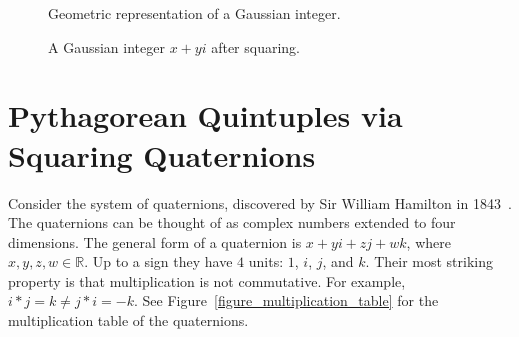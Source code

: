 \documentclass[12pt,table]{article}
\theoremstyle{definition}
\theoremstyle{remark}
\newcommand{\Rrr}{\mathbb R}
\numberwithin{equation}{section}
\begin{document}
\begin{figure}
\begin{center}
\end{center}
\caption{Geometric representation of a Gaussian integer.}
\label{figure_Pythagorean}
\end{figure}





\begin{figure}
\begin{center}
\end{center}
\caption{A Gaussian integer $x+yi$ after squaring.}
\label{figure_Pythagorean_squared}
\end{figure}

\section{Pythagorean Quintuples via Squaring Quaternions}


Consider the system of quaternions, discovered by Sir William Hamilton 
in 1843~\cite{Hamilton}.
The quaternions can be thought
of as complex numbers extended to four dimensions.
The general
 form of a quaternion is $x+yi+zj+wk$,
where $x, y, z, w \in \Rrr$.
Up to a sign they have $4$ units: $1$, $i$, $j$, and $k$. Their most striking
property is that multiplication is not commutative. 
For example, $i*j = k \neq j*i = -k$.
See Figure~\ref{figure_multiplication_table} 
for the multiplication table of the
quaternions.
\end{document}
